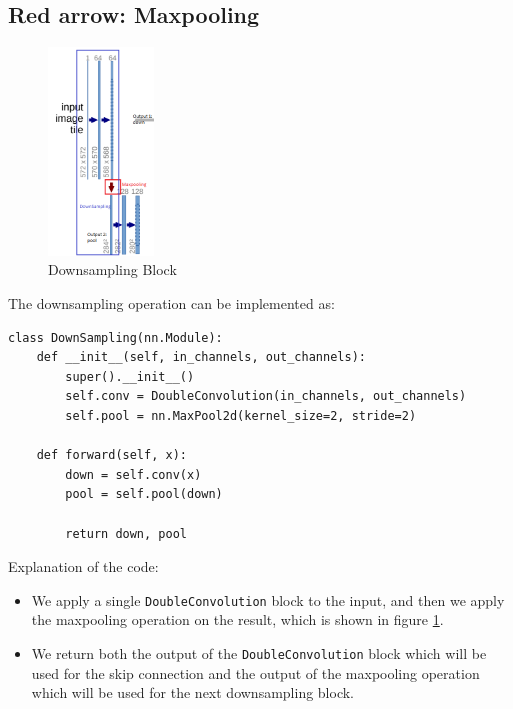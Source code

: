\documentclass{article}
\begin{document}
\subsection{Red arrow: Maxpooling}

\begin{figure}[H]
    \centering
    \includegraphics[width=0.25\textwidth]{latex/red_arrow.png}
    \caption{Downsampling Block}
    \label{fig:downsamlping_block}
\end{figure}

The downsampling operation can be implemented as:

\begin{verbatim}
class DownSampling(nn.Module):
    def __init__(self, in_channels, out_channels):
        super().__init__()
        self.conv = DoubleConvolution(in_channels, out_channels)
        self.pool = nn.MaxPool2d(kernel_size=2, stride=2)
    
    def forward(self, x):
        down = self.conv(x)
        pool = self.pool(down)

        return down, pool
\end{verbatim}

Explanation of the code:

\begin{itemize}
    \item We apply a single \texttt{DoubleConvolution} block to the input, and then we apply the maxpooling operation on the result, which is shown in figure \ref{fig:downsamlping_block}.
    \item We return both the output of the \texttt{DoubleConvolution} block which will be used for the skip connection and the output of the maxpooling operation which will be used for the next downsampling block.
\end{itemize}
\end{document}
